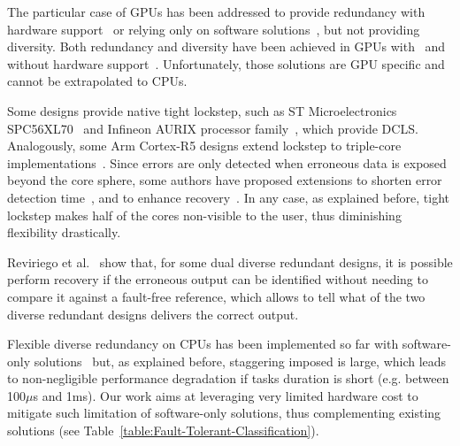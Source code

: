 The particular case of GPUs has been addressed to provide redundancy with hardware support~\cite{inter-intra-workgroup,Jeon2012,Swapcodes,Nathan2015} or relying only on software solutions~\cite{softwareapproaches_gpgpureliability,inter-intra-workgroup,Jain2019}, but not providing diversity. Both redundancy and diversity have been achieved in GPUs with~\cite{SergiDATE} and without hardware support~\cite{SergiIOLTS}. Unfortunately, those solutions are GPU specific and cannot be extrapolated to CPUs.

Some designs provide native tight lockstep, such as ST Microelectronics SPC56XL70~\cite{STlockstep} and Infineon AURIX processor family~\cite{infineon_aurix}, which provide DCLS. Analogously, some Arm Cortex-R5 designs extend lockstep to triple-core implementations~\cite{Iturbe2019,paper1}.
Since errors are only detected when erroneous data is exposed beyond the core sphere, some authors have proposed extensions to shorten error detection time~\cite{TCAD}, and to enhance recovery~\cite{DATEcheckpointing}. 
In any case, as explained before, tight lockstep makes half of the cores non-visible to the user, thus diminishing flexibility drastically.

Reviriego et al.~\cite{DivDMR} show that, for some dual diverse redundant designs, it is possible perform recovery if the erroneous output can be identified without needing to compare it against a fault-free reference, which allows to tell what of the two diverse redundant designs delivers the correct output.

Flexible diverse redundancy on CPUs has been implemented so far with software-only solutions~\cite{SergiDFT} but, as explained before, staggering imposed is large, which leads to non-negligible performance degradation if tasks duration is short (e.g. between 100$\mu$s and 1ms). 
Our work aims at leveraging very limited hardware cost to mitigate such limitation of software-only solutions, thus complementing existing solutions (see Table~\ref{table:Fault-Tolerant-Classification}).


